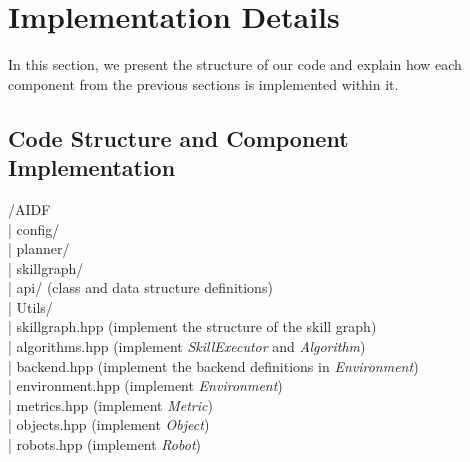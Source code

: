 \documentclass{article}
\begin{document}
\section{Implementation Details}
In this section, we present the structure of our code and explain how each component from the previous sections is implemented within it.

\subsection{Code Structure and Component Implementation}
/AIDF \\
\textbar | config/ \\
\textbar | planner/ \\
\textbar | skillgraph/ \\
\textbar\hspace{0.45cm}\textbar | api/ (class and data structure definitions) \\
\textbar\hspace{0.45cm}\textbar\hspace{0.45cm}\textbar | Utils/ \\
\textbar\hspace{0.45cm}\textbar\hspace{0.45cm}\textbar | skillgraph.hpp (implement the structure of the skill graph)\\
\textbar\hspace{0.45cm}\textbar\hspace{0.45cm}\textbar | algorithms.hpp (implement \textit{SkillExecutor} and \textit{Algorithm}) \\
\textbar\hspace{0.45cm}\textbar\hspace{0.45cm}\textbar | backend.hpp (implement the backend definitions in \textit{Environment})\\
\textbar\hspace{0.45cm}\textbar\hspace{0.45cm}\textbar | environment.hpp (implement \textit{Environment})\\
\textbar\hspace{0.45cm}\textbar\hspace{0.45cm}\textbar | metrics.hpp (implement \textit{Metric})\\
\textbar\hspace{0.45cm}\textbar\hspace{0.45cm}\textbar | objects.hpp (implement \textit{Object})\\
\textbar\hspace{0.45cm}\textbar\hspace{0.45cm}\textbar | robots.hpp (implement \textit{Robot})\\
\end{document}
